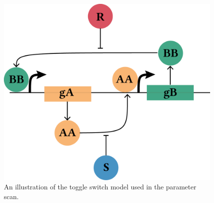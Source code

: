 \begin{figure}[tb]
	\begin{center}
\includegraphics[scale=0.6]{../../chapters/chapterABCSysBio/images/ma-switch-diagram.png}
\caption[An illustration of the toggle switch model used in the parameter scan.]{\label{fig:Gard_MA}An illustration of the toggle switch model used in the parameter scan. }
\end{center}
\end{figure}



